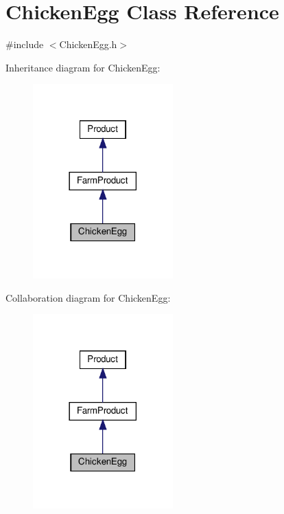 \hypertarget{classChickenEgg}{}\section{Chicken\+Egg Class Reference}
\label{classChickenEgg}


{\ttfamily \#include $<$Chicken\+Egg.\+h$>$}



Inheritance diagram for Chicken\+Egg\+:
\nopagebreak
\begin{figure}[H]
\begin{center}
\leavevmode
\includegraphics[width=153pt]{classChickenEgg__inherit__graph}
\end{center}
\end{figure}


Collaboration diagram for Chicken\+Egg\+:
\nopagebreak
\begin{figure}[H]
\begin{center}
\leavevmode
\includegraphics[width=153pt]{classChickenEgg__coll__graph}
\end{center}
\end{figure}
